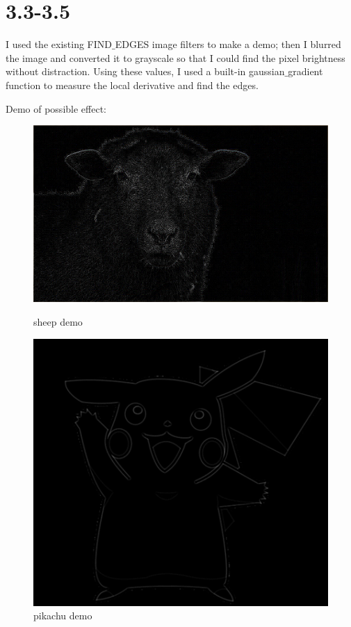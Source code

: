 \documentclass[a4paper,11pt,english]{article}
\begin{document}
\section{3.3-3.5}
I used the existing FIND$\_$EDGES image filters to make a demo; then I blurred the image and converted it to grayscale 
so that I could find the pixel brightness without distraction. Using these values, I 
used a built-in gaussian$\_$gradient function to measure the local derivative and find the edges.
\par Demo of possible effect:

\begin{figure}[H]
	\includegraphics[width=\linewidth]{sheep/sheep_FIND_EDGES_demo}
	\caption{sheep demo}  
	\includegraphics[width=\linewidth]{pikachu/pikachuFINDEDGESdemo}
	\caption{pikachu demo} 
\end{figure}
\end{document}

